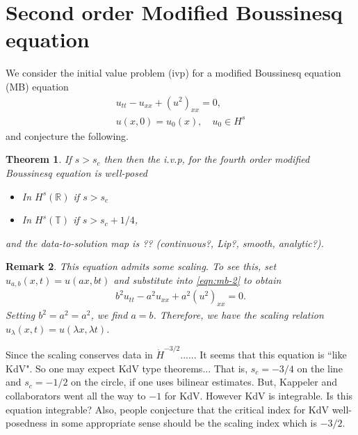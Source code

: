 \documentclass[12pt,reqno]{amsart}
\numberwithin{equation}{section}  %
\numberwithin{figure}{section}
\newcommand{\rr}{\mathbb{R}}
\newcommand{\ci}{\mathbb{T}}
\newtheorem{theorem}{Theorem}[section]
\newtheorem{remark}[theorem]{Remark}
\begin{document}
%
%
%
%
%
%
%
%



%
%
%
%
%


%
\section{Second order Modified Boussinesq  equation}
\label{sec:intro}
We consider the initial value problem (ivp) for a modified Boussinesq
equation (MB) equation 
\begin{gather}
  u_{tt} - u_{xx} + (u^2)_{xx} = 0,
  \label{eqn:mb}
  \\
  u(x,0) = u_{0}(x), \quad u_{0} \in H^{s}
  \label{eqn:mb-init-data}
\end{gather}
and conjecture the following.
%
%
%
%
%
%
%
%
\begin{theorem}
  If $s>s_c$ then then the  i.v.p, for the fourth order modified
  Boussinesq  equation is well-posed
  \begin{itemize}
    \item In $H^s(\rr)$ if $s > s_c$
    \item In $H^{s}(\ci)$ if $s > s_c + 1/4$,
  \end{itemize}
  and the data-to-solution map is  ?? (continuous?, Lip?, smooth, analytic?). 
  \label{thm:wp}
\end{theorem}
%

%
%
\begin{framed}
\begin{remark}
  This equation admits some scaling. To see this, set $u_{a,b}(x,t) =
  u(ax,bt)$ and substitute into \eqref{eqn:mb-2} to obtain
  \begin{equation*}
    \begin{split}
      b^{2}u_{tt} - a^{2}u_{xx} + a^{2}(u^{2})_{xx} = 0.
    \end{split}
  \end{equation*}
  Setting $b^{2} = a^{2} = a^{2}$, we
  find $a=b$. Therefore, we have the scaling relation
  $u_{\lambda}(x,t) = u(\lambda x, \lambda t)$. 
  \label{rem:}
\end{remark}
\end{framed}
%
%
Since the scaling conserves data in $\dot{H}^{-3/2}$......
It seems that this equation is ``like KdV".
So one may expect KdV type theorems...
That is, $s_c=-3/4$ on the line and $s_c=-1/2$ on the circle,
if one uses bilinear estimates.
But, Kappeler and collaborators went all the way to $-1$ for KdV.
However KdV is integrable. Is this equation integrable?
Also, people conjecture that the critical index for KdV well-posedness 
in some appropriate sense should be the scaling index which is  $-3/2$.




%
\end{document}
